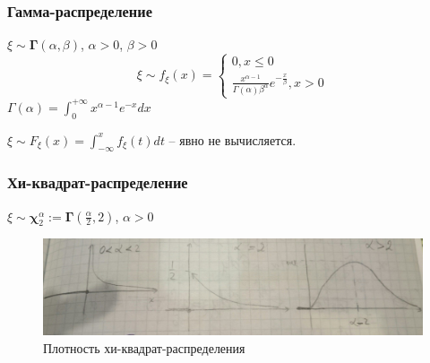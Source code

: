 \subsubsection{Гамма-распределение}
$\xi \sim \boldsymbol{\Gamma}(\alpha, \beta)$, $\alpha > 0$, $\beta > 0$
\begin{equation*}
	\xi \sim f_{\xi}(x) = 
		\begin{cases}
			0 , x \leq 0 \\			
			\frac{x^{\alpha - 1}}{\Gamma(\alpha) \beta^{\alpha}} e^{-\frac{x}{\beta}}, x > 0
		\end{cases}
\end{equation*}
$\Gamma(\alpha) = \int_{0}^{+\infty} x^{\alpha -1} e^{-x} dx$

$\xi \sim F_{\xi}(x) = \int_{-\infty}^x f_{\xi}(t)dt$ -- явно не вычисляется.
\subsubsection{Хи-квадрат-распределение}
$\xi \sim \boldsymbol{\chi}_{2}^{\alpha} := \boldsymbol{\Gamma}(\frac{\alpha}{2}, 2)$, $\alpha > 0$
\begin{figure}[H]
      \centering
      \includegraphics[width=0.8\linewidth]{img/chi.png}
      \caption{Плотность хи-квадрат-распределения}
\end{figure}